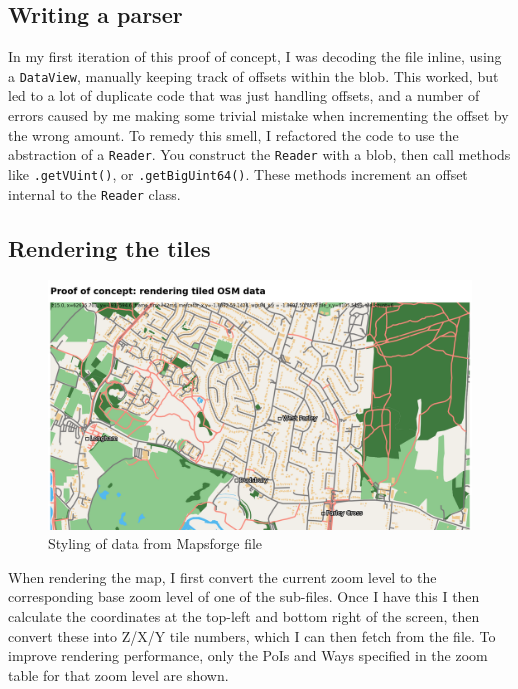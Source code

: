 \documentclass{final_report}
\begin{document}
\subsection{Writing a parser}

In my first iteration of this proof of concept, I was decoding the file inline, using a \texttt{DataView}, manually keeping track of offsets within the blob. This worked, but led to a lot of duplicate code that was just handling offsets, and a number of errors caused by me making some trivial mistake when incrementing the offset by the wrong amount. To remedy this smell, I refactored the code to use the abstraction of a \texttt{Reader}. You construct the \texttt{Reader} with a blob, then call methods like \texttt{.getVUint()}, or \texttt{.getBigUint64()}. These methods increment an offset internal to the \texttt{Reader} class.

\subsection{Rendering the tiles}

\begin{figure}[ht]
    \centering
    \includegraphics[width=\textwidth]{../proof-of-concepts/4-rendering-osm-data/screenshots/styled.png}
    \caption{Styling of data from Mapsforge file}\label{fig:rendering-osm-data}
\end{figure}

When rendering the map, I first convert the current zoom level to the corresponding base zoom level of one of the sub-files. Once I have this I then calculate the coordinates at the top-left and bottom right of the screen, then convert these into Z/X/Y tile numbers, which I can then fetch from the file. To improve rendering performance, only the PoIs and Ways specified in the zoom table for that zoom level are shown.
\end{document}
